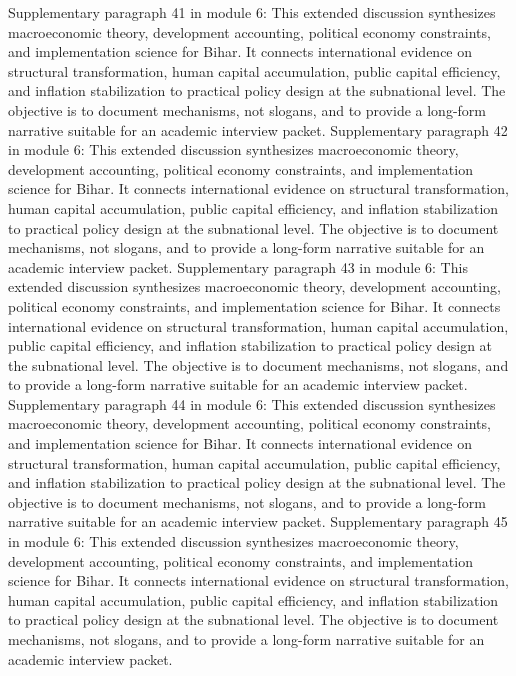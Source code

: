 \documentclass[preprint,12pt]{elsarticle}
\begin{document}
Supplementary paragraph 41 in module 6: This extended discussion synthesizes macroeconomic theory, development accounting, political economy constraints, and implementation science for Bihar. It connects international evidence on structural transformation, human capital accumulation, public capital efficiency, and inflation stabilization to practical policy design at the subnational level. The objective is to document mechanisms, not slogans, and to provide a long-form narrative suitable for an academic interview packet.
Supplementary paragraph 42 in module 6: This extended discussion synthesizes macroeconomic theory, development accounting, political economy constraints, and implementation science for Bihar. It connects international evidence on structural transformation, human capital accumulation, public capital efficiency, and inflation stabilization to practical policy design at the subnational level. The objective is to document mechanisms, not slogans, and to provide a long-form narrative suitable for an academic interview packet.
Supplementary paragraph 43 in module 6: This extended discussion synthesizes macroeconomic theory, development accounting, political economy constraints, and implementation science for Bihar. It connects international evidence on structural transformation, human capital accumulation, public capital efficiency, and inflation stabilization to practical policy design at the subnational level. The objective is to document mechanisms, not slogans, and to provide a long-form narrative suitable for an academic interview packet.
Supplementary paragraph 44 in module 6: This extended discussion synthesizes macroeconomic theory, development accounting, political economy constraints, and implementation science for Bihar. It connects international evidence on structural transformation, human capital accumulation, public capital efficiency, and inflation stabilization to practical policy design at the subnational level. The objective is to document mechanisms, not slogans, and to provide a long-form narrative suitable for an academic interview packet.
Supplementary paragraph 45 in module 6: This extended discussion synthesizes macroeconomic theory, development accounting, political economy constraints, and implementation science for Bihar. It connects international evidence on structural transformation, human capital accumulation, public capital efficiency, and inflation stabilization to practical policy design at the subnational level. The objective is to document mechanisms, not slogans, and to provide a long-form narrative suitable for an academic interview packet.
\end{document}
